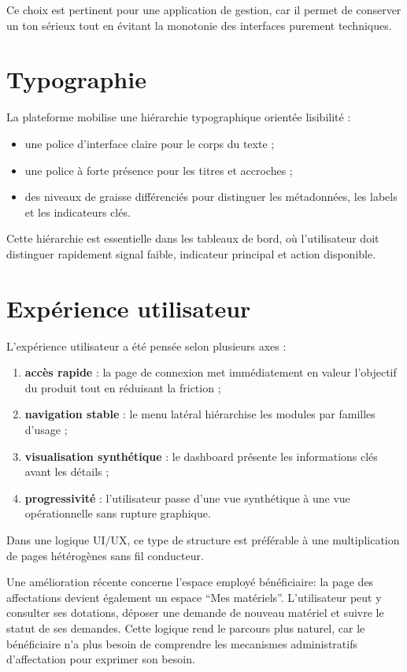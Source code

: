 Ce choix est pertinent pour une application de gestion, car il permet de conserver un ton sérieux tout en évitant la monotonie des interfaces purement techniques.

\section{Typographie}
La plateforme mobilise une hiérarchie typographique orientée lisibilité :
\begin{itemize}
  \item une police d'interface claire pour le corps du texte ;
  \item une police à forte présence pour les titres et accroches ;
  \item des niveaux de graisse différenciés pour distinguer les métadonnées, les labels et les indicateurs clés.
\end{itemize}

Cette hiérarchie est essentielle dans les tableaux de bord, où l'utilisateur doit distinguer rapidement signal faible, indicateur principal et action disponible.

\section{Expérience utilisateur}
L'expérience utilisateur a été pensée selon plusieurs axes :
\begin{enumerate}
  \item \textbf{accès rapide} : la page de connexion met immédiatement en valeur l'objectif du produit tout en réduisant la friction ;
  \item \textbf{navigation stable} : le menu latéral hiérarchise les modules par familles d'usage ;
  \item \textbf{visualisation synthétique} : le dashboard présente les informations clés avant les détails ;
  \item \textbf{progressivité} : l'utilisateur passe d'une vue synthétique à une vue opérationnelle sans rupture graphique.
\end{enumerate}

Dans une logique UI/UX, ce type de structure est préférable à une multiplication de pages hétérogènes sans fil conducteur.

Une amélioration récente concerne l'espace employé bénéficiaire: la page des affectations devient également un espace \enquote{Mes matériels}. L'utilisateur peut y consulter ses dotations, déposer une demande de nouveau matériel et suivre le statut de ses demandes. Cette logique rend le parcours plus naturel, car le bénéficiaire n'a plus besoin de comprendre les mecanismes administratifs d'affectation pour exprimer son besoin.

